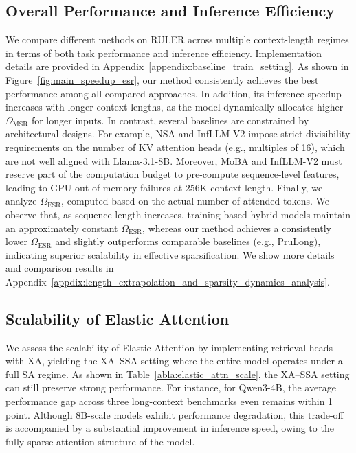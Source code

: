 \subsection{Overall Performance and Inference Efficiency}
\label{abaa:esr_speedup}
We compare different methods on RULER across multiple context-length regimes in terms of both task performance and inference efficiency.
Implementation details are provided in Appendix~\ref{appendix:baseline_train_setting}.
As shown in Figure~\ref{fig:main_speedup_esr}, our method consistently achieves the best performance among all compared approaches. 
In addition, its inference speedup increases with longer context lengths, as the model dynamically allocates higher $\Omega_\mathrm{MSR}$ for longer inputs.
In contrast, several baselines are constrained by architectural designs. 
For example, NSA and InfLLM-V2 impose strict divisibility requirements on the number of KV attention heads (e.g., multiples of 16), which are not well aligned with Llama-3.1-8B. Moreover, MoBA and InfLLM-V2 must reserve part of the computation budget to pre-compute sequence-level features, leading to GPU out-of-memory failures at 256K context length.
Finally, we analyze $\Omega_{\mathrm{ESR}}$, computed based on the actual number of attended tokens. 
We observe that, as sequence length increases, training-based hybrid models maintain an approximately constant $\Omega_{\mathrm{ESR}}$, whereas our method achieves a consistently lower $\Omega_{\mathrm{ESR}}$ and slightly outperforms comparable baselines (e.g., PruLong), indicating superior scalability in effective sparsification.
We show more details and comparison results in Appendix~\ref{appdix:length_extrapolation_and_sparsity_dynamics_analysis}.


\subsection{Scalability of Elastic Attention}
\label{abla:ela_attn_scale}
We assess the scalability of Elastic Attention by implementing retrieval heads with XA, yielding the XA–SSA setting where the entire model operates under a full SA regime.
As shown in Table~\ref{abla:elastic_attn_scale}, the XA–SSA setting can still preserve strong performance. 
For instance, for Qwen3-4B, the average performance gap across three long-context benchmarks even remains within 1 point.
Although 8B-scale models exhibit performance degradation, this trade-off is accompanied by a substantial improvement in inference speed, owing to the fully sparse attention structure of the model.









